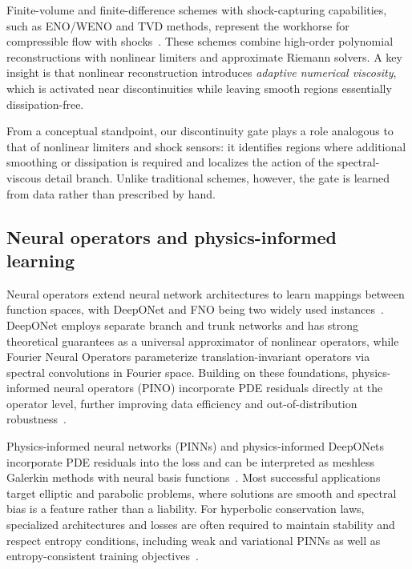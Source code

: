 \documentclass[a4paper,fleqn]{cas-dc}
\begin{document}
Finite-volume and finite-difference schemes with shock-capturing capabilities, such as ENO/WENO and TVD methods, represent the workhorse for compressible flow with shocks~\citep{ShuOsher1988ENO,JiangShu1996WENO,Toro1999Riemann}.
These schemes combine high-order polynomial reconstructions with nonlinear limiters and approximate Riemann solvers.
A key insight is that nonlinear reconstruction introduces \emph{adaptive numerical viscosity}, which is activated near discontinuities while leaving smooth regions essentially dissipation-free.

From a conceptual standpoint, our discontinuity gate plays a role analogous to that of nonlinear limiters and shock sensors: it identifies regions where additional smoothing or dissipation is required and localizes the action of the spectral-viscous detail branch.
Unlike traditional schemes, however, the gate is learned from data rather than prescribed by hand.

\subsection{Neural operators and physics-informed learning}

Neural operators extend neural network architectures to learn mappings between function spaces, with DeepONet and FNO being two widely used instances~\citep{Lu2021DeepONet,Li2021FNO,Kovachki2023NeuralOperator}.
DeepONet employs separate branch and trunk networks and has strong theoretical guarantees as a universal approximator of nonlinear operators, while Fourier Neural Operators parameterize translation-invariant operators via spectral convolutions in Fourier space.
Building on these foundations, physics-informed neural operators (PINO) incorporate PDE residuals directly at the operator level, further improving data efficiency and out-of-distribution robustness~\citep{Li2021PINO}.

Physics-informed neural networks (PINNs) and physics-informed DeepONets incorporate PDE residuals into the loss and can be interpreted as meshless Galerkin methods with neural basis functions~\citep{Raissi2019PINN,Karniadakis2021MachineLearningPDE,Cuomo2022PINNSurvey}.
Most successful applications target elliptic and parabolic problems, where solutions are smooth and spectral bias is a feature rather than a liability.
For hyperbolic conservation laws, specialized architectures and losses are often required to maintain stability and respect entropy conditions, including weak and variational PINNs as well as entropy-consistent training objectives~\citep{Mishra2022HyperbolicNN,Kharazmi2021hpPINN}.
\end{document}
